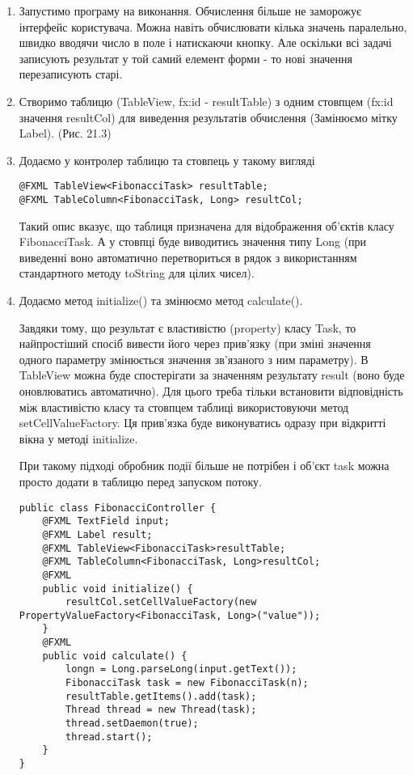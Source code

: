 \begin{enumerate}
	\item Запустимо програму на виконання.
Обчислення більше не заморожує інтерфейс користувача. Можна навіть обчислювати кілька значень паралельно, швидко вводячи число в поле і натискаючи кнопку. Але оскільки всі задачі записують результат у той самий елемент форми - то нові значення перезаписують старі. 

	\item Створимо таблицю (TableView, fx:id - resultTable) з одним стовпцем (fx:id значення resultCol) для виведення результатів обчислення (Замінюємо мітку Label). (Рис. 21.3) 

	\item Додаємо у контролер таблицю та стовпець у такому вигляді
\begin{verbatim}
@FXML TableView<FibonacciTask> resultTable;
@FXML TableColumn<FibonacciTask, Long> resultCol;
\end{verbatim}
Такий опис вказує, що таблиця призначена для відображення об'єктів класу FibonacciTask. А у стовпці буде виводитись значення типу Long (при виведенні воно автоматично перетвориться в рядок з використанням стандартного методу toString для цілих чисел).

	\item Додаємо метод initialize(){} та змінюємо метод  calculate().

	Завдяки тому, що результат є властивістю (property) класу Task, то найпростіший спосіб вивести його через прив'язку (при зміні значення одного параметру змінюється значення зв'язаного з ним параметру). В TableView можна буде спостерігати за значенням результату result (воно буде оновлюватись автоматично). Для цього треба тільки встановити відповідність між властивістю класу та стовпцем таблиці використовуючи метод setCellValueFactory. Ця прив'язка буде виконуватись одразу при відкритті вікна у методі initialize.

	При такому підході обробник події більше не потрібен і об'єкт task можна просто додати в таблицю перед запуском потоку.

\begin{verbatim}
public class FibonacciController {
	@FXML TextField input;
	@FXML Label result;
	@FXML TableView<FibonacciTask>resultTable;
	@FXML TableColumn<FibonacciTask, Long>resultCol;
	@FXML
	public void initialize() {
		resultCol.setCellValueFactory(new PropertyValueFactory<FibonacciTask, Long>("value"));
	}
	@FXML
	public void calculate() {
		longn = Long.parseLong(input.getText());
		FibonacciTask task = new FibonacciTask(n);
		resultTable.getItems().add(task);
		Thread thread = new Thread(task);
		thread.setDaemon(true);
		thread.start();
	}
}
\end{verbatim}


\end{enumerate}
